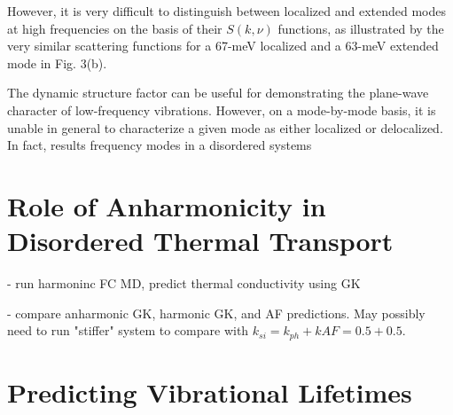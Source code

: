 \documentclass[aps,prb,preprint,superscriptaddress,amsmath,amssymb,floatfix]{revtex4}
\begin{document}
However, it is very
difficult to distinguish between localized and extended
modes at high frequencies on the basis of their $S(k,\nu)$
functions, as illustrated by the very similar scattering
functions for a 67-meV localized and a 63-meV extended
mode in Fig. 3(b). \cite{biswas_vibrational_1988}

The dynamic structure factor can be useful for demonstrating the 
plane-wave character of low-frequency vibrations.  However, on a 
mode-by-mode basis, it is unable in general to characterize a given mode 
as either localized or delocalized.  In fact, results   
frequency modes in a disordered systems


\vspace*{100mm}

\section{\label{S-Motivation-Amorphous}Role of Anharmonicity in 
Disordered Thermal Transport}
- run harmoninc FC MD, predict thermal conductivity using GK

- compare anharmonic GK, harmonic GK, and AF predictions. May possibly 
need to run "stiffer" system to compare with 
$k_{si} = k_{ph} + k{AF} = 0.5+0.5$. 


\vspace*{100mm}


\appendix
\section{\label{A-Predicting-Phonons}Predicting Vibrational Lifetimes}
\end{document}
